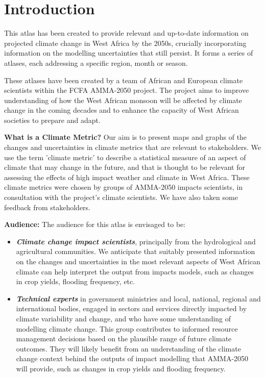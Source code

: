 \section{Introduction} \label{sec:intro}

This atlas has been created to provide relevant and up-to-date information on projected climate change in West Africa by the 2050s, crucially incorporating information on the modelling uncertainties that still persist. It forms a series of atlases, each addressing a specific region, month or season.

These atlases have been created by a team of African and European climate scientists within the FCFA AMMA-2050 project. The project aims to improve understanding of how the West African monsoon will be affected by climate change in the coming decades and to enhance the capacity of West African societies to prepare and adapt. 

\vspace{5mm}

\textbf{What is a Climate Metric?} Our aim is to present maps and graphs of the changes and uncertainties in climate metrics that are relevant to stakeholders. We use the term 'climate metric' to describe a statistical measure of an aspect of climate that may change in the future, and that is thought to be relevant for assessing the effects of high impact weather and climate in West Africa. These climate metrics were chosen by groups of AMMA-2050 impacts scientists, in consultation with the project's climate scientists. We have also taken some feedback from stakeholders.

\vspace{5mm}

\textbf{Audience:} The audience for this atlas is envisaged to be:

\begin{itemize}
  \item \textbf{\textit{Climate change impact scientists}}, principally from the hydrological and agricultural communities. We anticipate that suitably presented information on the changes and uncertainties in the most relevant aspects of West African climate can help interpret the output from impacts models, such as changes in crop yields, flooding frequency, etc.

  \item \textbf{\textit{Technical experts}} in government ministries and local, national, regional and international bodies, engaged in sectors and services directly impacted by climate variability and change, and who have some understanding of modelling climate change. This group contributes to informed resource management decisions based on the plausible range of future climate outcomes. They will likely benefit from an understanding of the climate change context behind the outputs of impact modelling that AMMA-2050 will provide, such as changes in crop yields and flooding frequency. 

\end{itemize}

